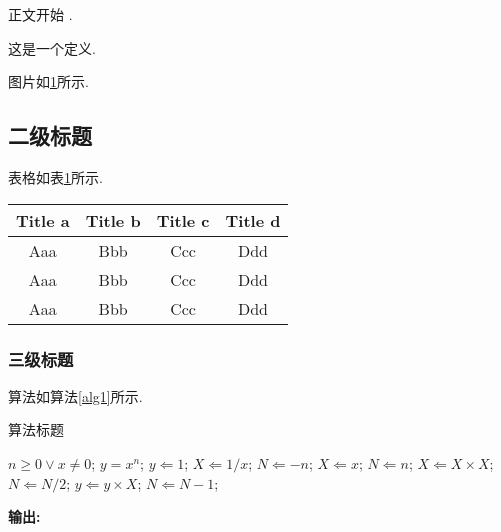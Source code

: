 \documentclass{SCIS2020cn}
\begin{document}
正文开始 \cite{ref,author}.

\begin{definition}\label{def1}
    这是一个定义.
\end{definition}

\newpage

图片如\ref{fig1}所示.
\begin{figure}[!t]
    \centering
    \label{fig1}
\end{figure}

\subsection{二级标题}
表格如表\ref{tab1}所示.
\begin{table}[!t]
    \label{tab1}
    \footnotesize
    \tabcolsep 49pt %
    \begin{tabular*}{\textwidth}{cccc}
        \toprule
        Title a & Title b & Title c & Title d \\\hline
        Aaa & Bbb & Ccc & Ddd\\
        Aaa & Bbb & Ccc & Ddd\\
        Aaa & Bbb & Ccc & Ddd\\
        \bottomrule
    \end{tabular*}
\end{table}

\subsubsection{三级标题}
算法如算法\ref{alg1}所示.
\begin{algorithm}
    \renewcommand{\algorithmicrequire}{\textbf{输入:}}%
    \renewcommand{\algorithmicensure}{\textbf{主迭代:}}%
    \newcommand{\LASTCON}{\item[\algorithmiclastcon]}
    \newcommand{\algorithmiclastcon}{\textbf{输出:}}%
    \footnotesize
    \caption{算法标题}
    \label{alg1}
    \begin{algorithmic}[1]
        \REQUIRE $n \geq 0 \vee x \neq 0$;
        \ENSURE $y = x^n$;
        \STATE $y \Leftarrow 1$;
        \STATE $X \Leftarrow 1 / x$;
        \STATE $N \Leftarrow -n$;
        \ELSE
        \STATE $X \Leftarrow x$;
        \STATE $N \Leftarrow n$;
        \ENDIF
        \STATE $X \Leftarrow X \times X$;
        \STATE $N \Leftarrow N / 2$;
        \ELSE[$N$ is odd]
        \STATE $y \Leftarrow y \times X$;
        \STATE $N \Leftarrow N - 1$;
        \ENDIF
        \ENDWHILE
        \LASTCON
    \end{algorithmic}
\end{algorithm}
\end{document}
